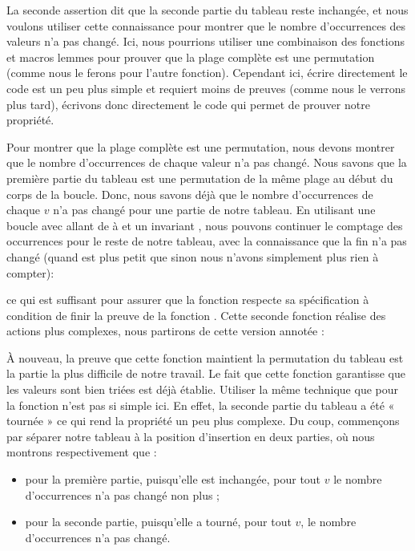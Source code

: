 La seconde assertion dit que la seconde partie du tableau reste inchangée, et nous
voulons utiliser cette connaissance pour montrer que le nombre d'occurrences des
valeurs n'a pas changé. Ici, nous pourrions utiliser une combinaison des
fonctions et macros lemmes pour prouver que la plage complète est une
permutation (comme nous le ferons pour l'autre fonction). Cependant ici, écrire
directement le code est un peu plus simple et requiert moins de preuves (comme
nous le verrons plus tard), écrivons donc directement le code qui permet de
prouver notre propriété.


Pour montrer que la plage complète est une permutation, nous devons montrer que le
nombre d'occurrences de chaque valeur n'a pas changé. Nous savons que la première
partie du tableau est une permutation de la même plage au début du corps de la
boucle. Donc, nous savons déjà que le nombre d'occurrences de chaque $v$ n'a pas
changé pour une partie de notre tableau. En utilisant une boucle avec
 allant de  à  et un invariant
, nous pouvons continuer le comptage des
occurrences pour le reste de notre tableau, avec la connaissance que la fin n'a
pas changé (quand  est plus petit que  sinon
nous n'avons simplement plus rien à compter):




ce qui est suffisant pour assurer que la fonction 
respecte sa spécification à condition de finir la preuve de la fonction
. Cette seconde fonction réalise des actions plus
complexes, nous partirons de cette version annotée :




À nouveau, la preuve que cette fonction maintient la permutation du tableau est
la partie la plus difficile de notre travail. Le fait que cette fonction
garantisse que les valeurs sont bien triées est déjà établie. Utiliser la
même technique que pour la fonction  n'est pas si
simple ici. En effet, la seconde partie du tableau a été « tournée » ce qui
rend la propriété un peu plus complexe. Du coup, commençons par séparer notre
tableau à la position d'insertion en deux parties, où nous montrons
respectivement que :


\begin{itemize}
    \item pour la première partie, puisqu'elle est inchangée, pour tout $v$
          le nombre d'occurrences n'a pas changé non plus ;
    \item pour la seconde partie, puisqu'elle a tourné, pour tout $v$, le
          nombre d'occurrences n'a pas changé.
\end{itemize}


